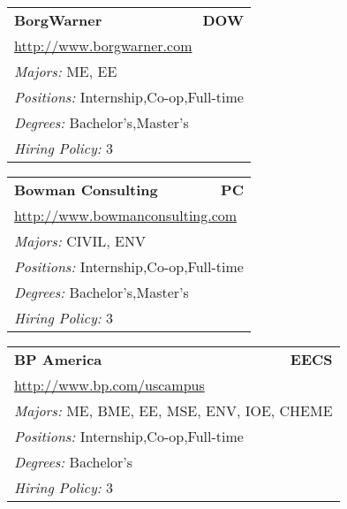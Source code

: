 \documentclass[twoside]{article}
\begin{document}
\begin{center}
\begin{multicols}{3}
\begin{FlushLeft}
\begin{minipage}{.9\columnwidth}\begin{tabularx}{.95\columnwidth}{Xr}
                 {\Large\bf BorgWarner} & {\Large\bf DOW}\\
    \multicolumn{2}{p{.95\columnwidth}}{\url{http://www.borgwarner.com}}\\
    \multicolumn{2}{p{.95\columnwidth}}{\emph{Majors:} ME, EE}\\
    \multicolumn{2}{p{.95\columnwidth}}{\emph{Positions:} Internship,Co-op,Full-time}\\
    \multicolumn{2}{p{.95\columnwidth}}{\emph{Degrees:} Bachelor's,Master's}\\
    \multicolumn{2}{p{.95\columnwidth}}{\emph{Hiring Policy:} 3}\\
    \end{tabularx}
    
\end{minipage}
 
\begin{minipage}{.9\columnwidth}\begin{tabularx}{.95\columnwidth}{Xr}
                 {\Large\bf Bowman Consulting} & {\Large\bf PC}\\
    \multicolumn{2}{p{.95\columnwidth}}{\url{http://www.bowmanconsulting.com}}\\
    \multicolumn{2}{p{.95\columnwidth}}{\emph{Majors:} CIVIL, ENV}\\
    \multicolumn{2}{p{.95\columnwidth}}{\emph{Positions:} Internship,Co-op,Full-time}\\
    \multicolumn{2}{p{.95\columnwidth}}{\emph{Degrees:} Bachelor's,Master's}\\
    \multicolumn{2}{p{.95\columnwidth}}{\emph{Hiring Policy:} 3}\\
    \end{tabularx}
    
\end{minipage}
 
\begin{minipage}{.9\columnwidth}\begin{tabularx}{.95\columnwidth}{Xr}
                 {\Large\bf BP America} & {\Large\bf EECS}\\
    \multicolumn{2}{p{.95\columnwidth}}{\url{http://www.bp.com/uscampus}}\\
    \multicolumn{2}{p{.95\columnwidth}}{\emph{Majors:} ME, BME, EE, MSE, ENV, IOE, CHEME}\\
    \multicolumn{2}{p{.95\columnwidth}}{\emph{Positions:} Internship,Co-op,Full-time}\\
    \multicolumn{2}{p{.95\columnwidth}}{\emph{Degrees:} Bachelor's}\\
    \multicolumn{2}{p{.95\columnwidth}}{\emph{Hiring Policy:} 3}\\
    \end{tabularx}
    

\end{minipage}
\end{FlushLeft}
\end{multicols}
\end{center}
\end{document}
